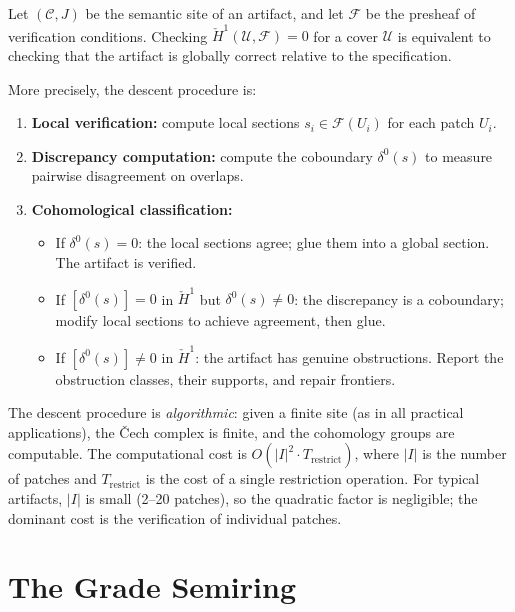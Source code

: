 \begin{theorem}
\label{thm:descent-verification}
Let $(\mathcal{C}, J)$ be the semantic site of an artifact, and let
$\mathcal{F}$ be the presheaf of verification conditions.  Checking
$\check{H}^1(\mathcal{U}, \mathcal{F}) = 0$ for a cover $\mathcal{U}$
is equivalent to checking that the artifact is globally correct
relative to the specification.

More precisely, the descent procedure is:
\begin{enumerate}[nosep]
\item \textbf{Local verification:} compute local sections
  $s_i \in \mathcal{F}(U_i)$ for each patch $U_i$.
\item \textbf{Discrepancy computation:} compute the coboundary
  $\delta^0(s)$ to measure pairwise disagreement on overlaps.
\item \textbf{Cohomological classification:}
  \begin{itemize}[nosep]
  \item If $\delta^0(s) = 0$: the local sections agree; glue them into
    a global section.  The artifact is verified.
  \item If $[\delta^0(s)] = 0$ in $\check{H}^1$ but $\delta^0(s) \neq 0$:
    the discrepancy is a coboundary; modify local sections to achieve
    agreement, then glue.
  \item If $[\delta^0(s)] \neq 0$ in $\check{H}^1$: the artifact has
    genuine obstructions.  Report the obstruction classes, their
    supports, and repair frontiers.
  \end{itemize}
\end{enumerate}
\end{theorem}

\begin{remark}
The descent procedure is \emph{algorithmic}: given a finite site (as
in all practical applications), the \v{C}ech complex is finite, and
the cohomology groups are computable.  The computational cost is
$O(|I|^2 \cdot T_{\mathrm{restrict}})$, where $|I|$ is the number of
patches and $T_{\mathrm{restrict}}$ is the cost of a single restriction
operation.  For typical artifacts, $|I|$ is small (2--20 patches), so
the quadratic factor is negligible; the dominant cost is the
verification of individual patches.
\end{remark}

\chapter{The Grade Semiring}
\label{ch:grade}

